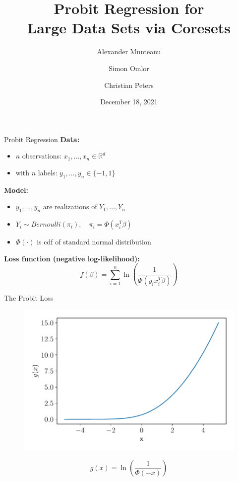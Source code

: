 \documentclass[gray]{beamer}
\title{Probit Regression for\\ Large Data Sets via Coresets}
\author{Alexander Munteanu \and Simon Omlor \and Christian Peters}
\institute{TU Dortmund University, Germany}
\date{December 18, 2021}
\begin{document}
\begin{frame}[noframenumbering]
    \thispagestyle{empty}
    \maketitle
\end{frame}

\begin{frame}{Probit Regression} \pause
    \textbf{Data:}
    \begin{itemize}
        \item $n$ observations: $x_1, \ldots, x_n \in \mathbb{R}^d$ \\
        \item with $n$ labels: $y_1, \ldots, y_n \in \{-1, 1\}$
    \end{itemize}

    \pause

    \vspace{\fill}

    \textbf{Model:}
    \begin{itemize}
        \item $y_1, \ldots, y_n$ are realizations of $Y_1, \ldots, Y_n$
        \item $Y_i \sim Bernoulli(\pi_i), \quad \pi_i = \Phi(x_i^T \beta)$
        \item $\Phi(\cdot)$ is cdf of standard normal distribution
    \end{itemize}

    \pause

    \vspace{\fill}

    \textbf{Loss function (negative log-likelihood):}
    \begin{equation*}
        f(\beta) = \sum_{i=1}^n \ln\left( \frac{1}{\Phi(y_ix_i^T\beta)} \right)
    \end{equation*}
\end{frame}

\begin{frame}{The Probit Loss}
    \begin{figure}[ht!]
        \centering
        \includegraphics[width=.95\linewidth]{../figures/probit_loss.pdf}
    \end{figure}
    \begin{equation*}
        g(x) = \ln\left(\frac{1}{\Phi(-x)}\right)
    \end{equation*}
\end{frame}
\end{document}
